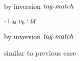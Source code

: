 {\begin{lamportproof*}
    \begin{pfproof}
        \begin{pfproof}
          by inversion $\textit{tag-match}$
        \end{pfproof}
      \qedstep
    \end{pfproof}

    \begin{pfproof}
      \absurdstep
        \begin{pfproof}
          ${\cdot} \vdash_{\mathsf{N}} v_0 : {\mathcal U}$
        \end{pfproof}
    \end{pfproof}

    \begin{pfproof}
        \begin{pfproof}
          by inversion $\textit{tag-match}$
        \end{pfproof}
      \qedstep
    \end{pfproof}

    \begin{pfproof}
      similar to previous case
    \end{pfproof}

\end{lamportproof*}}

